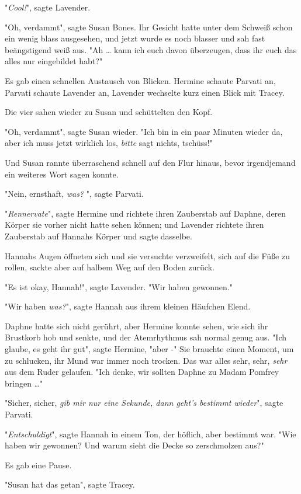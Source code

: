 {"\emph{Cool!}", sagte Lavender.

"Oh, verdammt", sagte Susan Bones. Ihr Gesicht hatte unter dem Schweiß schon ein wenig blass ausgesehen, und jetzt wurde es noch blasser und sah fast beängstigend weiß aus. "Ah … kann ich euch davon überzeugen, dass ihr euch das alles nur eingebildet habt?"

Es gab einen schnellen Austausch von Blicken. Hermine schaute Parvati an, Parvati schaute Lavender an, Lavender wechselte kurz einen Blick mit Tracey.

Die vier sahen wieder zu Susan und schüttelten den Kopf.

"Oh, verdammt", sagte Susan wieder. "Ich bin in ein paar Minuten wieder da, aber ich muss jetzt wirklich los, \emph{bitte} sagt nichts, tschüss!"

Und Susan rannte überraschend schnell auf den Flur hinaus, bevor irgendjemand ein weiteres Wort sagen konnte.

"Nein, ernsthaft, \emph{was?} ", sagte Parvati.

"\emph{Rennervate}", sagte Hermine und richtete ihren Zauberstab auf Daphne, deren Körper sie vorher nicht hatte sehen können; und Lavender richtete ihren Zauberstab auf Hannahs Körper und sagte dasselbe.

Hannahs Augen öffneten sich und sie versuchte verzweifelt, sich auf die Füße zu rollen, sackte aber auf halbem Weg auf den Boden zurück.

"Es ist okay, Hannah!", sagte Lavender. "Wir haben gewonnen."

"Wir haben \emph{was?}", sagte Hannah aus ihrem kleinen Häufchen Elend.

Daphne hatte sich nicht gerührt, aber Hermine konnte sehen, wie sich ihr Brustkorb hob und senkte, und der Atemrhythmus sah normal genug aus. "Ich glaube, es geht ihr gut", sagte Hermine, "aber -" Sie brauchte einen Moment, um zu schlucken, ihr Mund war immer noch trocken. Das war alles sehr, sehr, \emph{sehr} aus dem Ruder gelaufen. "Ich denke, wir sollten Daphne zu Madam Pomfrey bringen …"

"Sicher, sicher, \emph{gib mir nur eine Sekunde, dann geht's bestimmt wieder}", sagte Parvati.

"\emph{Entschuldigt}", sagte Hannah in einem Ton, der höflich, aber bestimmt war. "Wie haben wir gewonnen? Und warum sieht die Decke so zerschmolzen aus?"

Es gab eine Pause.

"Susan hat das getan", sagte Tracey.

}
